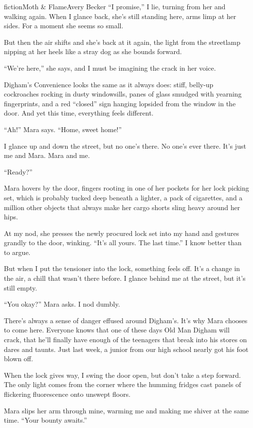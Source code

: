 \begin{prose}{fiction}{Moth \& Flame}{Avery Becker}
“I promise,” I lie, turning from her and walking again. When I glance back, she's still standing here, arms limp at her sides. For a moment she seems so small. \par
But then the air shifts and she's back at it again, the light from the streetlamp nipping at her heels like a stray dog as she bounds forward. \par
“We're here,” she says, and I must be imagining the crack in her voice.\par
Digham's Convenience looks the same as it always does: stiff, belly-up cockroaches rocking in dusty windowsills, panes of glass smudged with yearning fingerprints, and a red “closed” sign hanging lopsided from the window in the door. And yet this time, everything feels different.\par
“Ah!” Mara says. “Home, sweet home!”\par
I glance up and down the street, but no one's there. No one's ever there. It's just me and Mara. Mara and me. \par
“Ready?” \par
Mara hovers by the door, fingers rooting in one of her pockets for her lock picking set, which is probably tucked deep beneath a lighter, a pack of cigarettes, and a million other objects that always make her cargo shorts sling heavy around her hips. \par
At my nod, she presses the newly procured lock set into my hand and gestures grandly to the door, winking. “It's all yours. The last time.” I know better than to argue.\par
But when I put the tensioner into the lock, something feels off. It's a change in the air, a chill that wasn't there before. I glance behind me at the street, but it's still empty. \par
“You okay?” Mara asks. I nod dumbly. \par
There's always a sense of danger effused around Digham's. It's why Mara chooses to come here. Everyone knows that one of these days Old Man Digham will crack, that he'll finally have enough of the teenagers that break into his stores on dares and taunts. Just last week, a junior from our high school nearly got his foot blown off. \par
When the lock gives way, I swing the door open, but don't take a step forward. The only light comes from the corner where the humming fridges cast panels of flickering fluorescence onto unswept floors.\par
Mara slips her arm through mine, warming me and making me shiver at the same time. “Your bounty awaits.” \par

\end{prose}
